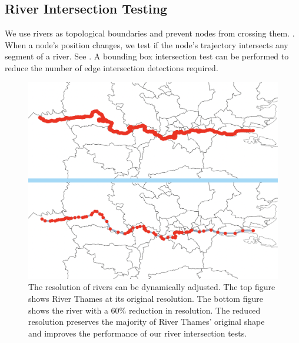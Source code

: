 
\subsection{River Intersection Testing}

We use rivers as topological boundaries and prevent nodes from crossing them. . When a node's position changes, we test if the node's trajectory intersects any segment of a river. See . A bounding box intersection test can be performed to reduce the number of edge intersection detections required.


{
\begin{figure}[tb!]
    \centering
    \includegraphics[width=\columnwidth]{figure/river_resolution.png}
    \caption{The resolution of rivers can be dynamically adjusted. The top figure shows River Thames at its original resolution. The bottom figure shows the river with a 60\% reduction in resolution. The reduced resolution preserves the majority of River Thames' original shape and improves the performance of our river intersection tests.}
    \label{fig:river resolution}
\end{figure}
}

